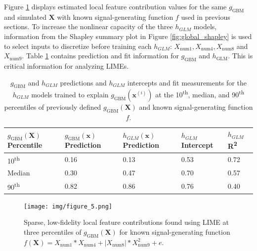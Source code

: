 \documentclass[sigconf, review]{acmart}
\begin{document}
Figure \ref{fig:lime} displays estimated local feature contribution values for the same $g_{\text{GBM}}$ and simulated $\mathbf{X}$ with known signal-generating function $f$ used in previous sections. To increase the nonlinear capacity of the three $h_{GLM}$ models, information from the Shapley summary plot in Figure \ref{fig:global_shapley} is used to select inputs to discretize before training each $h_{GLM}$: $X_{\text{num}1}, X_{\text{num}4}, X_{\text{num}8}$ and $X_{\text{num}9}$. Table \ref{tab:lime} contains prediction and fit information for $g_{\text{GBM}}$ and $h_{\text{GLM}}$. This is critical information for analyzing LIMEs.

\begin{table}[ht]
	\centering
	\caption{$g_{\text{GBM}}$ and $h_{GLM}$ predictions and $h_{GLM}$ intercepts and fit measurements for the $h_{GLM}$ models trained to explain $g_{\text{GBM}}(\mathbf{x}^{(i)})$ at the 10\textsuperscript{th}, median, and 90\textsuperscript{th} percentiles of previously defined $g_{\text{GBM}}(\mathbf{X})$ and known signal-generating function $f$.} 
	\begin{tabular}{ | p{1.5cm} | p{1.5cm} | p{1.5cm} | p{1.5cm}| p{0.7cm} | }
	\hline
	$g_{\text{GBM}}(\mathbf{X})$\newline Percentile & $g_{\text{GBM}}(\mathbf{x})$\newline Prediction & $h_{GLM}(\mathbf{x})$\newline Prediction & $h_{GLM}$\newline Intercept & $h_{GLM}$ R\textsuperscript{2} \\ 
	\hline
	10\textsuperscript{th} & 0.16 & 0.13 & 0.53 & 0.72\\
	\hline	
	Median & 0.30 & 0.47 & 0.70 & 0.57\\
	\hline	
	90\textsuperscript{th} & 0.82 & 0.86 & 0.76 & 0.40\\
	\hline
	\end{tabular}
	\label{tab:lime}
\end{table}	

\begin{figure}[htb]
	\begin{center}
		\texttt{[image: img/figure\_5.png]}
		\caption{Sparse, low-fidelity local feature contributions found using LIME at three percentiles of $g_{\text{GBM}}(\mathbf{X})$ for known signal-generating function $f(\mathbf{X}) = X_{\text{num}1} * X_{\text{num}4} + |X_{\text{num}8}| * X_{\text{num}9}^2 + e$.}
		\label{fig:lime}
	\end{center}
\end{figure}
\end{document}
